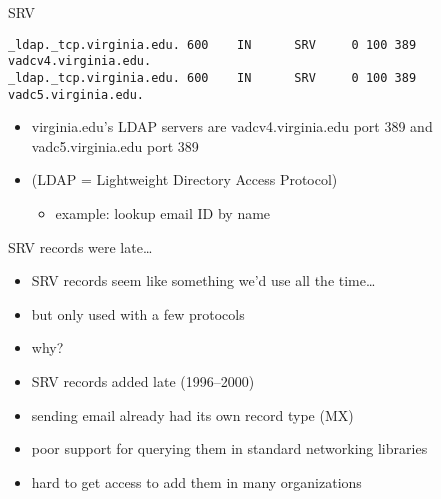 \begin{frame}[fragile]{SRV}
\begin{Verbatim}
_ldap._tcp.virginia.edu. 600    IN      SRV     0 100 389 vadcv4.virginia.edu.
_ldap._tcp.virginia.edu. 600    IN      SRV     0 100 389 vadc5.virginia.edu.
\end{Verbatim}
\begin{itemize}
\item virginia.edu's LDAP servers are vadcv4.virginia.edu port 389 and vadc5.virginia.edu port 389
\item (LDAP = Lightweight Directory Access Protocol)
    \begin{itemize}
    \item example: lookup email ID by name
    \end{itemize}
\end{itemize}
\end{frame}

\begin{frame}{SRV records were late\ldots}
\begin{itemize}
\item SRV records seem like something we'd use all the time\ldots
\item but only used with a few protocols
\item why?
\vspace{.5cm}
\item SRV records added late (1996--2000)
\item sending email already had its own record type (MX)
\item poor support for querying them in standard networking libraries
\item hard to get access to add them in many organizations
\end{itemize}
\end{frame}

